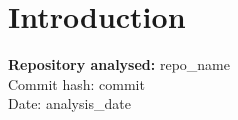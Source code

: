 \section*{Introduction}
\textbf{Repository analysed:} {{ repo_name }} \\
Commit hash: {{ commit }} \\
Date: {{ analysis_date }}
